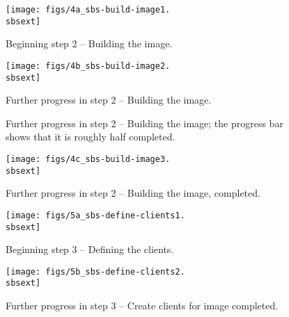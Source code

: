 


\begin{figure}[htbp]
  \begin{center}
    \centerline{\texttt{[image: figs/4a\_sbs-build-image1.\\sbsext]}}
    \caption{Beginning step 2 -- Building the image.}
    \label{fig:sbs-build-image}
  \end{center}
\end{figure}

\begin{figure}[htbp]
  \begin{center}
    \centerline{\texttt{[image: figs/4b\_sbs-build-image2.\\sbsext]}}
    \caption[Further progress in step 2 -- Building the
    image.]{Further progress in step 2 -- Building the image; the
      progress bar shows that it is roughly half completed.}
    \label{fig:sbs-build-image-progress}{Further progress in step 2 --
      Building the image.}
  \end{center}
\end{figure}


\begin{figure}[htbp]
  \begin{center}
    \centerline{\texttt{[image: figs/4c\_sbs-build-image3.\\sbsext]}}
    \caption{Further progress in step 2 -- Building the image, completed.}
    \label{fig:sbs-build-image2}
  \end{center}
\end{figure}

 
\begin{figure}[htbp]
  \begin{center}
    \centerline{\texttt{[image: figs/5a\_sbs-define-clients1.\\sbsext]}}
    \caption{Beginning step 3 -- Defining the clients.}
    \label{fig:sbs-define-clients}
  \end{center}
\end{figure}


\begin{figure}[htbp]
  \begin{center}
    \centerline{\texttt{[image: figs/5b\_sbs-define-clients2.\\sbsext]}}
    \caption{Further progress in step 3 -- Create clients for image
      completed.}
    \label{fig:sbs-define-clients2}
  \end{center}
\end{figure}

